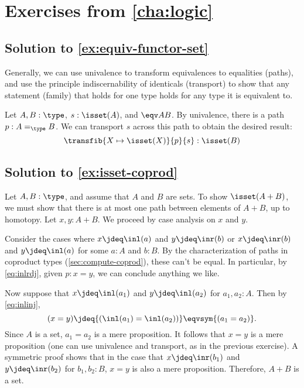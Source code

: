 \documentclass[
%
%
11pt %
]{article}
\begin{document}
\section*{Exercises from \cref{cha:logic}}

\subsection*{Solution to \cref{ex:equiv-functor-set}}


Generally, we can use univalence to transform equivalences to equalities
(paths), and use the principle indiscernability of identicals (transport) to
show that any statement (family) that holds for one type holds for any type it
is equivalent to. 

Let $A,B:\type$, $s:\isset(A)$, and $\eqv A B$. By univalence, there is
a path $p:A=_{\type}B$. We can transport $s$ across this path to obtain the
desired result:
\begin{equation*}
	\transfib{X\mapsto \isset(X)}{p}{s} : \isset(B)
\end{equation*}

\subsection*{Solution to \cref{ex:isset-coprod}}

Let $A,B:\type$, and assume that $A$ and $B$ are sets. To show $\isset(A+B)$, we
must show that there is at most one path between elements of $A+B$, up to
homotopy. Let $x,y:A+B$. We proceed by case analysis on $x$ and $y$.

Consider the cases where $x\jdeq \inl(a)$ and $y\jdeq \inr(b)$ or
$x\jdeq \inr(b)$ and $y\jdeq \inl(a)$ for some $a:A$ and $b:B$. By the
characterization of paths in coproduct types (\cref{sec:compute-coprod}), these
can't be equal. In particular, by \eqref{eq:inlrdj}, given $p:x=y$, we can
conclude anything we like.

Now suppose that $x\jdeq \inl(a_1)$ and $y\jdeq \inl(a_2)$ for $a_1,a_2:A$. Then
by \eqref{eq:inlinj},
\begin{equation*}
	(x=y)\jdeq {(\inl(a_1)=\inl(a_2))}\eqvsym {(a_1=a_2)}.
\end{equation*}
Since $A$ is a set, $a_1=a_2$ is a mere proposition. It follows that
$x=y$ is a mere proposition (one can use univalence and
transport, as in the previous exercise). A symmetric proof shows that 
in the case that $x\jdeq \inr(b_1)$ and $y\jdeq \inr(b_2)$ for $b_1,b_2:B$,
$x=y$ is also a mere proposition. Therefore, $A+B$ is a set.
\end{document}
